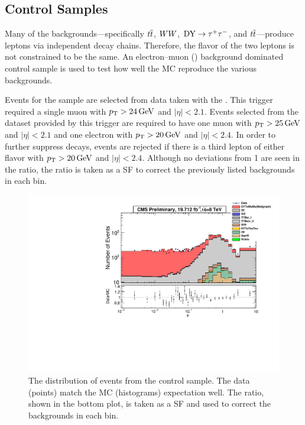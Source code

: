 \subsection{\emu Control Samples}

Many of the backgrounds---specifically $t\overline{t}$, $WW$, $\text{DY} \to \tau^{+} \tau^{-}$, and
$t\overline{t}$---produce leptons via independent decay chains. Therefore, the flavor
of the two leptons is not constrained to be the same. An electron--muon
(\emu) background dominated control sample is used to test how well the MC
reproduce the various backgrounds.

Events for the \emu sample are selected from data taken with the
\SingleMuonTrigger. This trigger required a single muon with $p_{\mathrm{T}} > 24 \,\text{Ge\hspace{-.08em}V}$
and $|\eta| < 2.1$. Events selected from the dataset provided by this trigger
are required to have one muon with $p_{\mathrm{T}} > 25 \,\text{Ge\hspace{-.08em}V}$ and $|\eta| < 2.1$ and one
electron with $p_{\mathrm{T}} > 20 \,\text{Ge\hspace{-.08em}V}$ and $|\eta| < 2.4$. In order to further suppress
\Z decays, events are rejected if there is a third lepton of either flavor with
$p_{\mathrm{T}} > 20 \,\text{Ge\hspace{-.08em}V}$ and $|\eta| < 2.4$.  Although no
deviations from \num{1} are seen in the ratio, the ratio is taken as a SF to
correct the previously listed backgrounds in each bin.

\begin{figure}[htbp]
    \centering
    \includegraphics[width=\textwidth]{figures/phistar_emu.pdf}
    \caption{
        The \phistar distribution of events from the \emu control sample. The
        data (points) match the MC (histograms) expectation well. The ratio,
        shown in the bottom plot, is taken as a SF and used to correct the
        backgrounds in each bin.
    }
    \label{fig:emu_background_check}
\end{figure}

